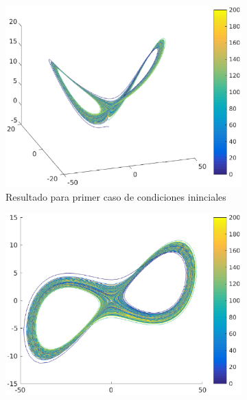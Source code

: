 \documentclass[12pt,letterpaper]{article}
\begin{document}

\begin{figure}
	\centering
	\begin{subfigure}[b]{0.36\textwidth}
		\includegraphics[width=\textwidth]{pictures/tercera_simulacion}
		\caption{Resultado para primer caso de condiciones ininciales}
		\label{fig:simulacion3}
	\end{subfigure}
	\begin{subfigure}[b]{0.36\textwidth}
		\includegraphics[width=\textwidth]{pictures/tercera_simulacion_xy}

\end{subfigure}
\end{figure}
\end{document}
